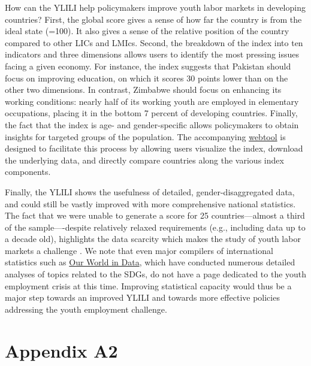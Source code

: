 \documentclass[
  a4paper, twoside, 12pt]{book}
\begin{document}
How can the YLILI help policymakers improve youth labor markets in developing countries? First, the global score gives a sense of how far the country is from the ideal state (=100). It also gives a sense of the relative position of the country compared to other LICs and LMIcs. Second, the breakdown of the index into ten indicators and three dimensions allows users to identify the most pressing issues facing a given economy. For instance, the index suggests that Pakistan should focus on improving education, on which it scores 30 points lower than on the other two dimensions. In contrast, Zimbabwe should focus on enhancing its working conditions: nearly half of its working youth are employed in elementary occupations, placing it in the bottom 7 percent of developing countries. Finally, the fact that the index is age- and gender-specific allows policymakers to obtain insights for targeted groups of the population. The accompanying \href{https://nadel.shinyapps.io/ylili}{webtool} is designed to facilitate this process by allowing users visualize the index, download the underlying data, and directly compare countries along the various index components.

Finally, the YLILI shows the usefulness of detailed, gender-disaggregated data, and could still be vastly improved with more comprehensive national statistics. The fact that we were unable to generate a score for 25 countries---almost a third of the sample----despite relatively relaxed requirements (e.g., including data up to a decade old), highlights the data scarcity which makes the study of youth labor markets a challenge \autocite{jerven2013}. We note that even major compilers of international statistics such as \href{https://ourworldindata.org/}{Our World in Data}, which have conducted numerous detailed analyses of topics related to the SDGs, do not have a page dedicated to the youth employment crisis at this time. Improving statistical capacity would thus be a major step towards an improved YLILI and towards more effective policies addressing the youth employment challenge.

\newpage
{}
\printbibliography[segment=\therefsegment,heading=subbibintoc,title={References}]

\newpage

\hypertarget{appendix-a}{%
\section*{Appendix A2}\label{appendix-a}}
\end{document}
